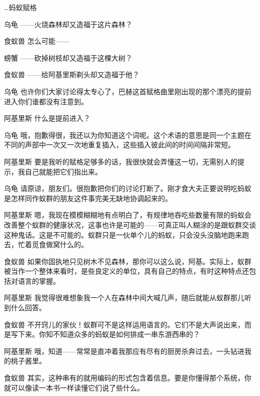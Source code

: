 \begin{dialog}{…蚂蚁赋格}
\begin{dialogue}
\item[乌龟]——火烧森林却又造福于这片森林？

\item[食蚁兽]怎么可能——

\item[螃蟹]——砍掉树枝却又造福于这棵大树？

\item[食蚁兽]——给阿基里斯剃头却又造福于他？

\item[乌龟]也许你们大家讨论得太专心了，巴赫这首赋格曲里刚出现的那个漂亮的提前进入你们谁都没有注意到。

\item[阿基里斯]什么是提前进入？

\item[乌龟]哦，抱歉得很，我还以为你知道这个词呢。这个术语的意思是同一个主题在不同的声部中一次又一次地重复插入，这些插入彼此间的时间间隔非常短。

\item[阿基里斯]要是我听的赋格足够多的话，我很快就会弄懂这一切，无需别人的提示，我自己就能把它们指出来。

\item[乌龟]请原谅，朋友们。很抱歉把你们的讨论打断了。刚才食大夫正要说明吃蚂蚁是怎样同作蚁群的朋友这件事完美无缺地协调起来的。

\item[阿基里斯]嗯，我现在模模糊糊地有点明白了，有规律地吞吃些数量有限的蚂蚁会改善整个蚁群的健康状况，这事也许是可能的——可真正叫人糊涂的是跟蚁群交谈这种鬼话。这是不可能的。蚁群只是一伙单个儿的蚂蚁，只会没头没脑地跑来跑去，忙着觅食做窝什么的。

\item[食蚁兽]如果你固执地只见树木不见森林，那你可以这么说，阿基。实际上，蚁群被当作一个整体来看时，是些良定义的单位，具有自己的特点，有时这种特点还包括对语言的掌握。

\item[阿基里斯]我觉得很难想象我一个人在森林中间大喊几声，随后就能从蚁群那儿听到什么回答。

\item[食蚁兽]不开窍儿的家伙！蚁群可不是这样运用语言的。它们不是大声说出来，而是写下来。你知不知道众多的蚂蚁是如何排成一串东游西串的？

\item[阿基里斯]哦，知道——常常是直冲着我那应有尽有的厨房杀奔过去，一头钻进我的桃子酱里。

\item[食蚁兽]其实，这种串有的就用编码的形式包含着信息。要是你懂得那个系统，你就可以像读一本书一样读懂它们说了些什么。


\end{dialogue}
\end{dialog}
